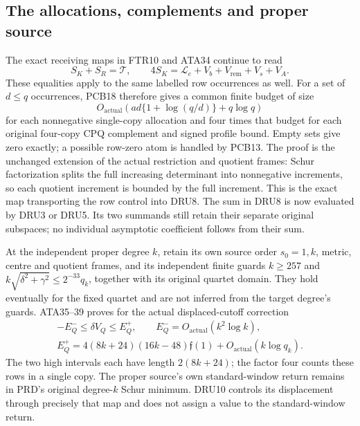 \documentclass[11pt,a4paper]{article}
\begin{document}
\subsection{The allocations, complements and proper source}
The exact receiving maps in FTR10 and ATA34 continue to read
\[
 S_K+S_R=\mathcal T,\qquad
 4S_K=\mathcal L_e+V_b+V_{\mathrm{rem}}+V_s+V_A.
 \tag{DRU8}
\]
These equalities apply to the same labelled row occurrences as well.
For a set of $d\le q$ occurrences, PCB18 therefore gives a common
finite budget of size
\[
 O_{\mathrm{actual}}\!\left(
 ad\{1+\log(q/d)\}+q\log q\right)
 \tag{DRU9}
\]
for each nonnegative single-copy allocation and four times that
budget for each original four-copy CPQ complement and signed
profile bound.  Empty sets give zero exactly; a possible row-zero
atom is handled by PCB13.  The proof is the unchanged extension of
the actual restriction and quotient frames: Schur factorization
splits the full increasing determinant into nonnegative increments,
so each quotient increment is bounded by the full increment.
This is the exact map transporting the row control into DRU8.
The sum in DRU8 is now evaluated by DRU3 or DRU5.  Its two summands
still retain their separate original subspaces; no individual
asymptotic coefficient follows from their sum.

At the independent proper degree $k$, retain its own source order
$s_0=1,k$, metric, centre and quotient frames, and its independent
finite guards $k\ge257$ and
$k\sqrt{\delta^2+\gamma^2}\le2^{-33}q_k$, together with its original
quartet domain.  They hold eventually for the fixed quartet and are
not inferred from the target degree's guards.  ATA35--39 proves
for the actual displaced-cutoff correction
\[
\begin{gathered}
 -E_Q^-\le\delta V_Q\le E_Q^+,\qquad
 E_Q^-=O_{\mathrm{actual}}(k^2\log k),\\
 E_Q^+=4(8k+24)(16k-48)\mathfrak f(1)
            +O_{\mathrm{actual}}(k\log q_k).
\end{gathered}
 \tag{DRU10}
\]
The two high intervals each have length $2(8k+24)$; the factor
four counts these rows in a single copy.  The proper source's own
standard-window return remains in PRD's original degree-$k$
Schur minimum.  DRU10 controls its displacement through precisely
that map and does not assign a value to the standard-window return.
\end{document}
